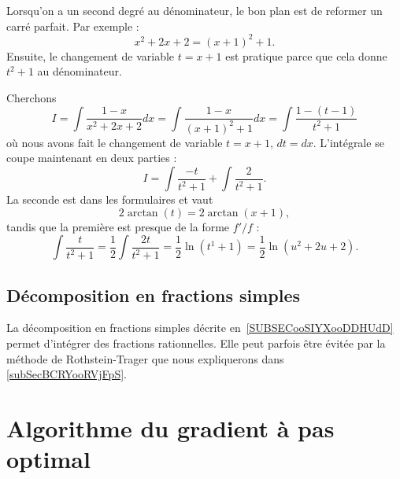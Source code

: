 Lorsqu'on a un second degré au dénominateur, le bon plan est de reformer un carré parfait. Par exemple :
\begin{equation}
	x^2+2x+2=(x+1)^2+1.
\end{equation}
Ensuite, le changement de variable \( t=x+1\) est pratique parce que cela donne \( t^2+1\) au dénominateur.

Cherchons
\begin{equation}
	I=\int \frac{ 1-x }{ x^2+2x+2 }dx=\int\frac{ 1-x }{ (x+1)^2+1 }dx=\int\frac{ 1-(t-1) }{ t^2+1 }
\end{equation}
où nous avons fait le changement de variable \( t=x+1\), \( dt=dx\). L'intégrale se coupe maintenant en deux parties :
\begin{equation}
	I=\int\frac{ -t }{ t^2+1 }+\int \frac{ 2 }{ t^2+1 }.
\end{equation}
La seconde est dans les formulaires et vaut
\begin{equation}
	2\arctan(t)=2\arctan(x+1),
\end{equation}
tandis que la première est presque de la forme \( f'/f\) :
\begin{equation}
	\int\frac{ t }{ t^2+1 }=\frac{ 1 }{2}\int \frac{ 2t }{ t^2+1 }=\frac{ 1 }{2}\ln(t^1+1)=\frac{ 1 }{2}\ln(u^2+2u+2).
\end{equation}

\subsection{Décomposition en fractions simples}

La décomposition en fractions simples décrite en~\ref{SUBSECooSIYXooDDHUdD} permet d'intégrer des fractions rationnelles. Elle peut parfois être évitée par la méthode de Rothstein-Trager que nous expliquerons dans \ref{subSecBCRYooRVjFpS}.

\section{Algorithme du gradient à pas optimal}

